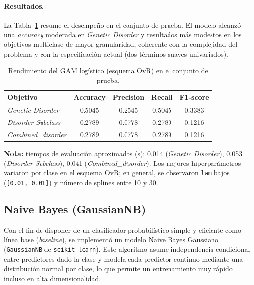 \documentclass[11pt,a4paper,spanish]{book}
\numberwithin{equation}{chapter}
\numberwithin{figure}{chapter}
\begin{document}
\paragraph{Resultados.}
La Tabla~\ref{tab:gam-resultados} resume el desempeño en el conjunto de prueba.
El modelo alcanzó una \textit{accuracy} moderada en \textit{Genetic Disorder} y resultados más modestos
en los objetivos multiclase de mayor granularidad, coherente con la complejidad del problema
y con la especificación actual (dos términos suaves univariados).

\begin{table}[H]
\centering
\caption{Rendimiento del GAM logístico (esquema OvR) en el conjunto de prueba.}
\label{tab:gam-resultados}
\begin{tabular}{lcccc}
\toprule
\textbf{Objetivo} & \textbf{Accuracy} & \textbf{Precision} & \textbf{Recall} & \textbf{F1-score} \\
\midrule
\textit{Genetic Disorder}      & 0.5045 & 0.2545 & 0.5045 & 0.3383 \\
\textit{Disorder Subclass}     & 0.2789 & 0.0778 & 0.2789 & 0.1216 \\
\textit{Combined\_disorder}    & 0.2789 & 0.0778 & 0.2789 & 0.1216 \\
\bottomrule
\end{tabular}

\vspace{0.5em}
\footnotesize
\textbf{Nota:} tiempos de evaluación aproximados (s): 0.014 (\textit{Genetic Disorder}),
0.053 (\textit{Disorder Subclass}), 0.041 (\textit{Combined\_disorder}).
Los mejores hiperparámetros variaron por clase en el esquema OvR; en general, se observaron
\texttt{lam} bajos (\texttt{[0.01, 0.01]}) y número de splines entre 10 y 30.
\end{table}

\subsection{Naive Bayes (GaussianNB)}
\label{subsec:naive-bayes}

Con el fin de disponer de un clasificador probabilístico simple y eficiente como línea base
(\textit{baseline}), se implementó un modelo Naive Bayes Gaussiano (\texttt{GaussianNB} de
\texttt{scikit-learn}). Este algoritmo asume independencia condicional entre predictores
dado la clase y modela cada predictor continuo mediante una distribución normal por clase,
lo que permite un entrenamiento muy rápido incluso en alta dimensionalidad.
\end{document}
